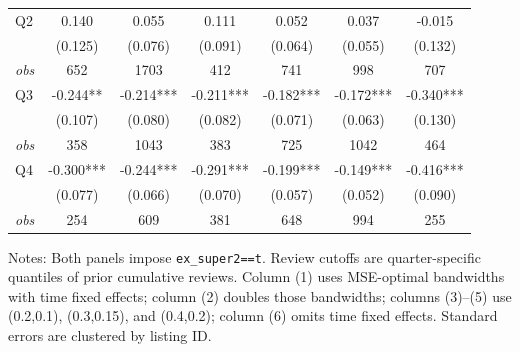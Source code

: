 \begin{table}[!htbp]
\begin{tabular}{lcccccc}
Q2 & 0.140 & 0.055 & 0.111 & 0.052 & 0.037 & -0.015 \\
 & (0.125) & (0.076) & (0.091) & (0.064) & (0.055) & (0.132) \\
\textit{obs} & 652 & 1703 & 412 & 741 & 998 & 707 \\
Q3 & -0.244** & -0.214*** & -0.211*** & -0.182*** & -0.172*** & -0.340*** \\
 & (0.107) & (0.080) & (0.082) & (0.071) & (0.063) & (0.130) \\
\textit{obs} & 358 & 1043 & 383 & 725 & 1042 & 464 \\
Q4 & -0.300*** & -0.244*** & -0.291*** & -0.199*** & -0.149*** & -0.416*** \\
 & (0.077) & (0.066) & (0.070) & (0.057) & (0.052) & (0.090) \\
\textit{obs} & 254 & 609 & 381 & 648 & 994 & 255 \\
\bottomrule
\end{tabular}
\begin{minipage}{0.98\textwidth}\footnotesize
Notes: Both panels impose \texttt{ex\_super2==t}. Review cutoffs are quarter-specific quantiles of prior cumulative reviews. Column (1) uses MSE-optimal bandwidths with time fixed effects; column (2) doubles those bandwidths; columns (3)--(5) use (0.2,0.1), (0.3,0.15), and (0.4,0.2); column (6) omits time fixed effects. Standard errors are clustered by listing ID.
\end{minipage}
\end{table}


